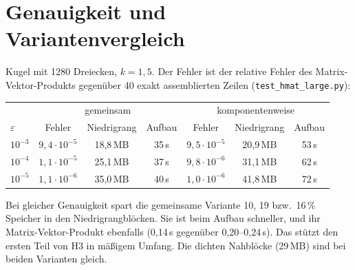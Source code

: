 \documentclass[11pt, a4paper]{article}
\begin{document}
\section{Genauigkeit und Variantenvergleich}
Kugel mit 1280 Dreiecken, $k=1{,}5$. Der Fehler ist der relative Fehler des
Matrix-Vektor-Produkts gegenüber 40 exakt assemblierten Zeilen
(\texttt{test\_hmat\_large.py}):
\begin{center}\small
\begin{tabular}{lcccccc}
\toprule
& \multicolumn{3}{c}{gemeinsam} & \multicolumn{3}{c}{komponentenweise}\\
$\varepsilon$ & Fehler & Niedrigrang & Aufbau & Fehler & Niedrigrang & Aufbau\\
\midrule
$10^{-3}$ & $9{,}4\cdot10^{-5}$ & 18,8\,MB & 35\,s & $9{,}5\cdot10^{-5}$ & 20,9\,MB & 53\,s\\
$10^{-4}$ & $1{,}1\cdot10^{-5}$ & 25,1\,MB & 37\,s & $9{,}8\cdot10^{-6}$ & 31,1\,MB & 62\,s\\
$10^{-5}$ & $1{,}1\cdot10^{-6}$ & 35,0\,MB & 40\,s & $1{,}0\cdot10^{-6}$ & 41,8\,MB & 72\,s\\
\bottomrule
\end{tabular}
\end{center}
Bei gleicher Genauigkeit spart die gemeinsame Variante 10, 19 bzw.\ 16\,\% Speicher in den
Niedrigrangblöcken. Sie ist beim Aufbau schneller, und ihr Matrix-Vektor-Produkt
ebenfalls (0,14\,s gegenüber 0,20--0,24\,s). Das stützt den ersten Teil von H3 in mäßigem
Umfang. Die dichten Nahblöcke (29\,MB) sind bei beiden Varianten gleich.
\end{document}
